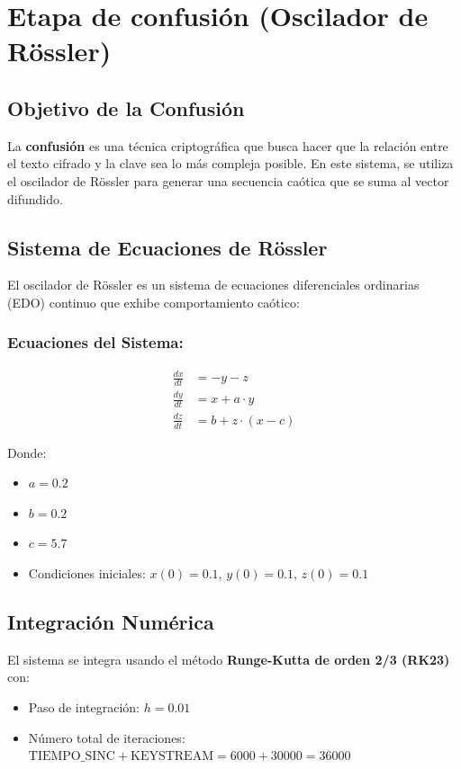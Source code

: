 \documentclass[12pt,a4paper]{article}
\begin{document}
	\section{Etapa de confusión (Oscilador de Rössler)}
	
	\subsection{Objetivo de la Confusión}
	
	La \textbf{confusión} es una técnica criptográfica que busca hacer que la relación entre el texto cifrado y la clave sea lo más compleja posible. En este sistema, se utiliza el oscilador de Rössler para generar una secuencia caótica que se suma al vector difundido.
	
	\subsection{Sistema de Ecuaciones de Rössler}
	
	El oscilador de Rössler es un sistema de ecuaciones diferenciales ordinarias (EDO) continuo que exhibe comportamiento caótico:
	
	\subsubsection*{Ecuaciones del Sistema:}
	\begin{equation}
		\begin{aligned}
			\frac{dx}{dt} &= -y - z \\
			\frac{dy}{dt} &= x + a \cdot y \\
			\frac{dz}{dt} &= b + z \cdot (x - c)
		\end{aligned}
		\label{eq:rossler}
	\end{equation}
	
	Donde:
	\begin{itemize}
		\item $a = 0.2$
		\item $b = 0.2$
		\item $c = 5.7$
		\item Condiciones iniciales: $x(0) = 0.1$, $y(0) = 0.1$, $z(0) = 0.1$
	\end{itemize}
	
	\subsection{Integración Numérica}
	
	El sistema se integra usando el método \textbf{Runge-Kutta de orden 2/3 (RK23)} con:
	\begin{itemize}
		\item Paso de integración: $h = 0.01$
		\item Número total de iteraciones: $\text{TIEMPO\_SINC} + \text{KEYSTREAM} = 6000 + 30000 = 36000$
	\end{itemize}
	
\end{document}

